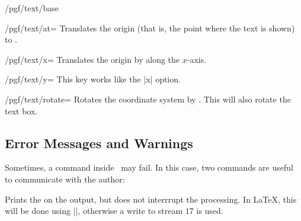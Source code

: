\begin{command}{\pgftext{}}
\begin{key}{/pgf/text/base}
\begin{codeexample}[]
\end{codeexample}
  \end{key}
  \begin{key}{/pgf/text/at=}
    Translates the origin (that is, the point where the text is
    shown) to .
\begin{codeexample}[]
\end{codeexample}
  \end{key}
  \begin{key}{/pgf/text/x=}
    Translates the origin by  along the $x$-axis.
\begin{codeexample}[]
\end{codeexample}
  \end{key}
  \begin{key}{/pgf/text/y=}
    This key works like the |x| option.
  \end{key}
  \begin{key}{/pgf/text/rotate=}
    Rotates the coordinate system by . This will also
    rotate the text box.
\begin{codeexample}[]
\end{codeexample}
\end{key}

\end{command}


\subsection{Error Messages and Warnings}

Sometimes, a command inside \pgfname\ may fail. In this case, two
commands are useful to communicate with the author:


\begin{command}{\pgfwarning{}}
  Prints the  on the output, but does not interrrupt the
  processing. In \LaTeX, this will be done using |\PackageWarning|,
  otherwise a write to stream $17$ is used.
\end{command}
